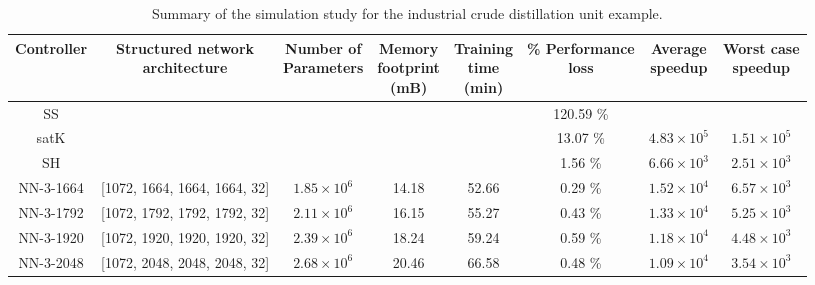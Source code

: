 \documentclass[preprint,5p, twocolumn, authoryear]{elsarticle}
\begin{document}
\begin{table}[t]
    \caption{Summary of the simulation study for the industrial crude
    distillation unit example.}
\begin{tabular}{ |c|c|c|c|c|c|c|c| }
          \hline
          Controller & \thead{Structured network \\ architecture} &
          \thead{Number of \\ Parameters} & \thead{Memory \\ footprint \\ (mB)}
          & \thead{Training \\ time \\ (min)} & \thead{\% Performance\\ loss} &
          \thead{Average \\ speedup} & \thead{Worst case \\ speedup} \\
          \hline
      SS &  &  & &  & 120.59 \% &  & \\ 
  satK &  &  &   &  & 13.07 \% & $4.83 \times 10^5$ & $1.51 \times 10^5$ \\ 
  SH &  &  &  &  & 1.56 \% & $6.66 \times 10^3$  & $2.51 \times 10^3$ \\ 
  NN-3-1664 & [1072, 1664, 1664, 1664, 32] & $1.85 \times 10^6$ & 14.18 & 52.66
  & 0.29 \% & $1.52 \times 10^4$ & $6.57 \times 10^3$  \\ 
  NN-3-1792 & [1072, 1792, 1792, 1792, 32]  & $2.11 \times 10^6$ & 16.15  &
  55.27 & 0.43 \% & $1.33 \times 10^4$ & $5.25 \times 10^3$ \\ 
  NN-3-1920 & [1072, 1920, 1920, 1920, 32]  & $2.39 \times 10^6$ & 18.24  &
  59.24 & 0.59 \% & $1.18 \times 10^4$ & $4.48 \times 10^3$ \\ 
  NN-3-2048 & [1072, 2048, 2048, 2048, 32]  & $2.68 \times 10^6$ & 20.46  &
  66.58 & 0.48 \% & $1.09 \times 10^4$ & $3.54 \times 10^3$\\ 
\hline
\end{tabular}
\label{table:cdu}      
\end{table}
\end{document}
